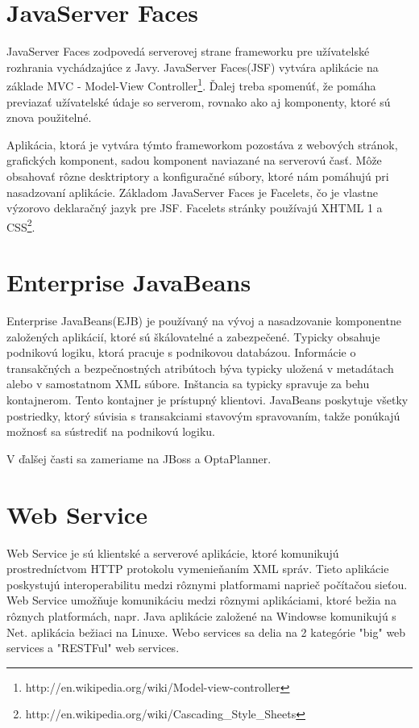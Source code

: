 \section{JavaServer Faces}
JavaServer Faces zodpovedá serverovej strane frameworku pre užívatelské rozhrania vychádzajúce z Javy. JavaServer Faces(JSF) vytvára aplikácie na základe MVC - Model-View Controller\footnote{http://en.wikipedia.org/wiki/Model-view-controller}. Ďalej treba spomenúť, že pomáha previazať užívatelské údaje so serverom, rovnako ako aj komponenty, ktoré sú znova použitelné.

\indent Aplikácia, ktorá je vytvára týmto frameworkom pozostáva z webových stránok, grafických komponent, sadou komponent naviazané na serverovú časť. Môže obsahovať rôzne desktriptory a konfiguračné súbory, ktoré nám pomáhujú pri nasadzovaní aplikácie. Základom JavaServer Faces je Facelets, čo je vlastne výzorovo deklaračný jazyk pre JSF. Facelets stránky používajú XHTML 1 a CSS\footnote{http://en.wikipedia.org/wiki/Cascading\_Style\_Sheets}. 

\section{Enterprise JavaBeans}
Enterprise JavaBeans(EJB) je používaný na vývoj a nasadzovanie komponentne založených aplikácií, ktoré sú škálovatelné a zabezpečené. Typicky obsahuje podnikovú logiku, ktorá pracuje s podnikovou databázou. Informácie o transakčných a bezpečnostných atribútoch býva typicky uložená v metadátach alebo v samostatnom XML súbore. Inštancia sa typicky spravuje za behu kontajnerom. Tento kontajner je prístupný klientovi. JavaBeans poskytuje všetky postriedky, ktorý súvisia s transakciami stavovým spravovaním, takže ponúkajú možnosť sa sústrediť na podnikovú logiku. 

V ďalšej časti sa zameriame na JBoss a OptaPlanner.

\section{Web Service}
Web Service je sú klientské a serverové aplikácie, ktoré komunikujú prostredníctvom HTTP protokolu vymenieňaním XML správ. Tieto aplikácie poskystujú interoperabilitu medzi rôznymi platformami naprieč počítačou sieťou. Web Service umožňuje komunikáciu medzi rôznymi aplikáciami, ktoré bežia na rôznych platformách, napr. Java aplikácie založené na Windowse komunikujú s Net. aplikácia bežiaci na Linuxe. Webo services  sa delia na 2 kategórie "big" web services a "RESTFul" web services.

